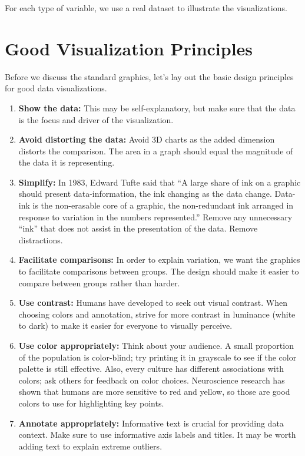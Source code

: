 \documentclass[
]{book}
\begin{document}
For each type of variable, we use a real dataset to illustrate the visualizations.

\hypertarget{good-visualization-principles}{%
\section{Good Visualization Principles}\label{good-visualization-principles}}

Before we discuss the standard graphics, let's lay out the basic design principles for good data visualizations.

\begin{enumerate}
\def\labelenumi{\arabic{enumi}.}
\item
  \textbf{Show the data:} This may be self-explanatory, but make sure that the data is the focus and driver of the visualization.
\item
  \textbf{Avoid distorting the data:} Avoid 3D charts as the added dimension distorts the comparison. The area in a graph should equal the magnitude of the data it is representing.
\item
  \textbf{Simplify:} In 1983, Edward Tufte said that ``A large share of ink on a graphic should present data-information, the ink changing as the data change. Data-ink is the non-erasable core of a graphic, the non-redundant ink arranged in response to variation in the numbers represented.'' Remove any unnecessary ``ink'' that does not assist in the presentation of the data. Remove distractions.
\item
  \textbf{Facilitate comparisons:} In order to explain variation, we want the graphics to facilitate comparisons between groups. The design should make it easier to compare between groups rather than harder.
\item
  \textbf{Use contrast:} Humans have developed to seek out visual contrast. When choosing colors and annotation, strive for more contrast in luminance (white to dark) to make it easier for everyone to visually perceive.
\item
  \textbf{Use color appropriately:} Think about your audience. A small proportion of the population is color-blind; try printing it in grayscale to see if the color palette is still effective. Also, every culture has different associations with colors; ask others for feedback on color choices. Neuroscience research has shown that humans are more sensitive to red and yellow, so those are good colors to use for highlighting key points.
\item
  \textbf{Annotate appropriately:} Informative text is crucial for providing data context. Make sure to use informative axis labels and titles. It may be worth adding text to explain extreme outliers.
\end{enumerate}
\end{document}
